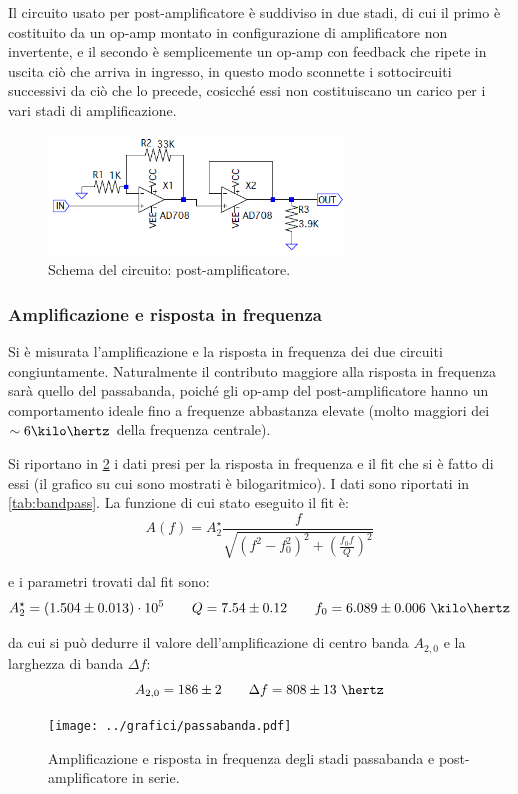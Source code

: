 \documentclass[a4paper,10pt]{article}
\begin{document}
Il circuito usato per post-amplificatore è suddiviso in due stadi, di cui il primo è costituito da un op-amp montato in configurazione di amplificatore non invertente, e il secondo è semplicemente un op-amp con feedback che ripete in uscita ciò che arriva in ingresso, in questo modo sconnette i sottocircuiti successivi da ciò che lo precede, cosicché essi non costituiscano un carico per i vari stadi di amplificazione. 

\begin{figure}[H]
	\vspace{-10pt}
	\centering
	\includegraphics[width=0.7\textwidth]{../grafici/PostAmp.png}
	\vspace{-12pt}
	\caption{Schema del circuito: post-amplificatore.}
	\label{fig:postamp}
	\vspace{-6pt}
\end{figure}

\subsubsection*{Amplificazione e risposta in frequenza}

Si è misurata l'amplificazione e la risposta in frequenza dei due circuiti congiuntamente. Naturalmente il contributo maggiore alla risposta in frequenza sarà quello del passabanda, poiché gli op-amp del post-amplificatore hanno un comportamento ideale fino a frequenze abbastanza elevate (molto maggiori dei $\sim 6 \kilo\hertz $ della frequenza centrale).

Si riportano in \cref{fig:FITbandpass} i dati presi per la risposta in frequenza e il fit che si è fatto di essi (il grafico su cui sono mostrati è bilogaritmico). I dati sono riportati in \cref{tab:bandpass}.
La funzione di cui stato eseguito il fit è:
\[ A(f) = A_2^\star \frac{f}{\sqrt{(f^2-f_0^2)^2 + \left(\frac{f_0 f}{Q}\right)^2}} \]

e i parametri trovati dal fit sono:
\[ A_2^\star=(1.504 \pm 0.013)\cdot10^5 \qquad Q=7.54 \pm 0.12 \qquad f_0=6.089 \pm 0.006~\kilo\hertz  \]


da cui si può dedurre il valore dell'amplificazione di centro banda $ A_{2,0} $ e la larghezza di banda $ \Delta f $:
\[ A_{2,0} = 186 \pm 2	\qquad	\Delta f = 808 \pm 13 ~\hertz \]
\vspace*{-30pt}
\begin{figure}[H]
	\centering
	\texttt{[image: ../grafici/passabanda.pdf]}
	\vspace*{-5pt}
	\caption{Amplificazione e risposta in frequenza degli stadi passabanda e post-amplificatore in serie.}
	\label{fig:FITbandpass}
\end{figure}
\end{document}
